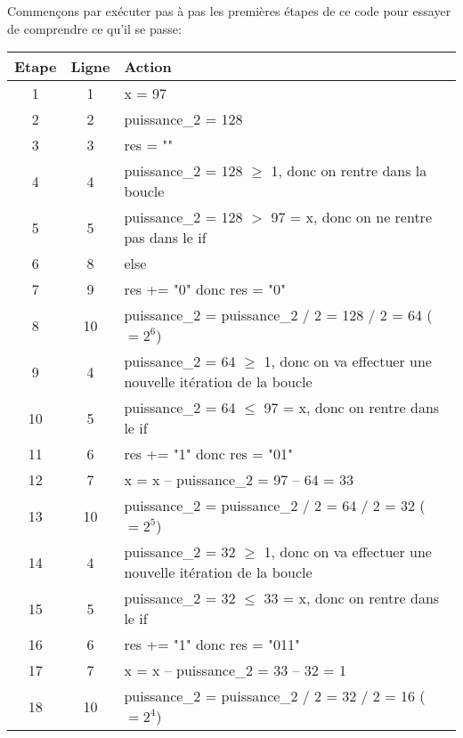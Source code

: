 \documentclass[11pt,a4paper]{exam}
\begin{document}
\begin{questions}
\begin{spacing}{1}
\begin{solution}
             	Commençons par exécuter pas à pas les premières étapes de ce code pour essayer de comprendre ce qu'il se passe:
             	
             	\begin{center}		
             		\begin{tabular}{|c|c|l|}
             			\hline
             			\textbf{Etape} & \textbf{Ligne} & \textbf{Action} \\ \hline
             			1 & 1 & x = 97 \\ \hline
             			2 & 2 & puissance\_2 = 128 \\ \hline
             			3 & 3 & res = "" \\ \hline
             			4 & 4 & puissance\_2 = 128 $\ge$ 1, donc on rentre dans la boucle \\ \hline
             			5 & 5 & puissance\_2 = 128 $>$ 97 = x, donc on ne rentre pas dans le if \\ \hline
             			6 & 8 & else \\ \hline
             			7 & 9 & res += "0" donc res = "0" \\ \hline
             			8 & 10 & puissance\_2 = puissance\_2 / 2 = 128 / 2 = 64 ($= 2^6$) \\ \hline
             			9 & 4 & puissance\_2 = 64 $\ge$ 1, donc on va effectuer une nouvelle itération de la boucle \\ \hline
             			10 & 5 & puissance\_2 = 64 $\le$ 97 = x, donc on rentre dans le if \\ \hline
             			11 & 6 & res += "1" donc res = "01" \\ \hline
             			12 & 7 & x = x -- puissance\_2 = 97 -- 64 = 33 \\ \hline
             			13 & 10 & puissance\_2 = puissance\_2 / 2 = 64 / 2 = 32 ($= 2^5$) \\ \hline
             			14 & 4 & puissance\_2 = 32 $\ge$ 1, donc on va effectuer une nouvelle itération de la boucle \\ \hline
             			15 & 5 & puissance\_2 = 32 $\le$ 33 = x, donc on rentre dans le if \\ \hline
             			16 & 6 & res += "1" donc res = "011" \\ \hline
             			17 & 7 & x = x -- puissance\_2 = 33 -- 32 = 1 \\ \hline
             			18 & 10 & puissance\_2 = puissance\_2 / 2 = 32 / 2 = 16 ($= 2^4$) \\ \hline
             		\end{tabular}
             	\end{center}
             	

\end{solution}
\end{spacing}
\end{questions}
\end{document}
